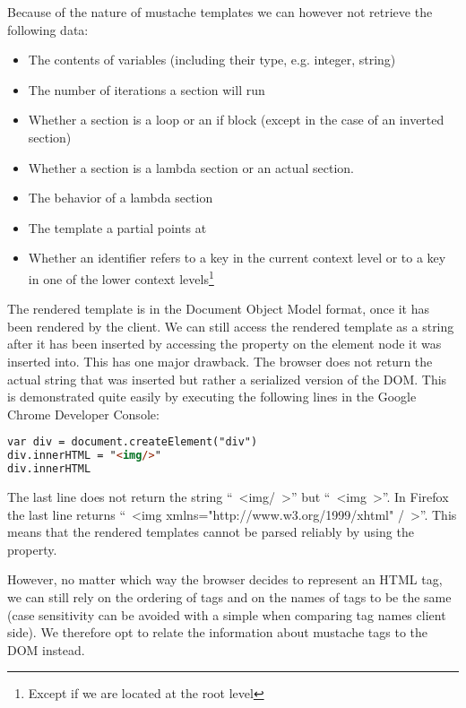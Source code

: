 \documentclass[thesis.tex]{subfiles}
\begin{document}
Because of the nature of mustache templates we can however not retrieve the
following data:

\begin{itemize}
\item The contents of variables (including their type, e.g. integer, string)
\item The number of iterations a section will run
\item Whether a section is a loop or an if block
      (except in the case of an inverted section)
\item Whether a section is a lambda section or an actual section.
\item The behavior of a lambda section
\item The template a partial points at
\item Whether an identifier refers to a key in the current context level or
      to a key in one of the lower context levels\footnote{
            Except if we are located at the root level}
\end{itemize}

The rendered template is in the Document Object Model format, once it has
been rendered by the client. We can still access the rendered template as a
string after it has been inserted by accessing the  property
on the element node it was inserted into. This has one major drawback.
The browser does not return the actual string that was inserted but rather a
serialized version of the DOM. This is demonstrated quite easily by executing
the following lines in the Google Chrome Developer Console:
\begin{lstlisting}[language=HTML]
var div = document.createElement("div")
div.innerHTML = "<img/>"
div.innerHTML
\end{lstlisting}

The last line does not return the string ``\ <img/\ >'' but ``\ <img\ >''.
In Firefox the last line returns ``\ <img xmlns="http://www.w3.org/1999/xhtml" /\ >''.
This means that the rendered templates cannot be parsed reliably by using the
 property.

However, no matter which way the browser decides to represent an HTML tag,
we can still rely on the ordering of tags and on the names of tags to be the same
(case sensitivity can be avoided with a simple
 when comparing tag names client side).
We therefore opt to relate the information about mustache tags to the DOM instead.
\end{document}

